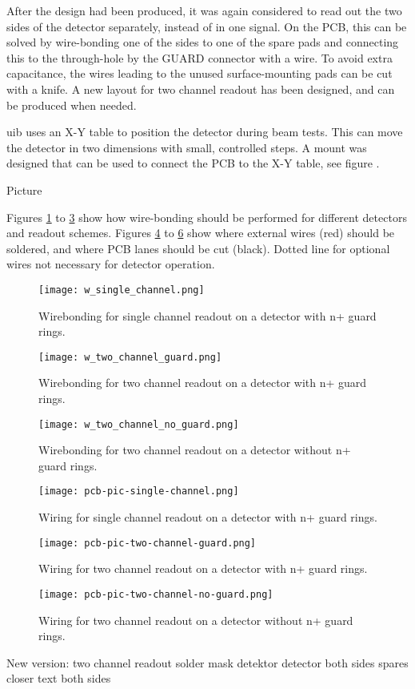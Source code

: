 \documentclass[../main/thesis.tex]{subfiles}
\begin{document}
After the design had been produced, it was again considered to read out the two sides of the detector separately, instead of in one signal. On the \gls{PCB}, this can be solved by wire-bonding one of the sides to one of the spare pads and connecting this to the through-hole by the GUARD connector with a wire. To avoid extra capacitance, the wires leading to the unused surface-mounting pads can be cut with a knife. A new layout for two channel readout has been designed, and can be produced when needed. 

\gls{uib} uses an X-Y table to position the detector during beam tests. This can move the detector in two dimensions with small, controlled steps. A mount was designed that can be used to connect the PCB to the X-Y table, see figure . 

Picture

Figures \ref{fig-wire-1-g} to \ref{fig-wire-2} show how wire-bonding should be performed for different detectors and readout schemes. Figures \ref{fig-wiring-1-g} to \ref{fig-wiring-2} show where external wires (red) should be soldered, and where PCB lanes should be cut (black). Dotted line for optional wires not necessary for detector operation.

\begin{figure}%
	\centering
	\texttt{[image: w\_single\_channel.png]}
	\caption{Wirebonding for single channel readout on a detector with n+ guard rings.}
	\label{fig-wire-1-g} 
\end{figure}

\begin{figure}%
	\centering
	\texttt{[image: w\_two\_channel\_guard.png]}
	\caption{Wirebonding for two channel readout on a detector with n+ guard rings.}
	\label{fig-wire-2-g} 
\end{figure}

\begin{figure}%
	\centering
	\texttt{[image: w\_two\_channel\_no\_guard.png]}
	\caption{Wirebonding for two channel readout on a detector without n+ guard rings.}
	\label{fig-wire-2} 
\end{figure}

\begin{figure}%
	\centering
	\texttt{[image: pcb-pic-single-channel.png]}
	\caption{Wiring for single channel readout on a detector with n+ guard rings.}
	\label{fig-wiring-1-g} 
\end{figure}

\begin{figure}%
	\centering
	\texttt{[image: pcb-pic-two-channel-guard.png]}
	\caption{Wiring for two channel readout on a detector with n+ guard rings.}
	\label{fig-wiring-2-g} 
\end{figure}

\begin{figure}%
	\centering
	\texttt{[image: pcb-pic-two-channel-no-guard.png]}
	\caption{Wiring for two channel readout on a detector without n+ guard rings.}
	\label{fig-wiring-2} 
\end{figure}

New version:
two channel readout
solder mask detektor
detector both sides
spares closer
text both sides
\end{document}
